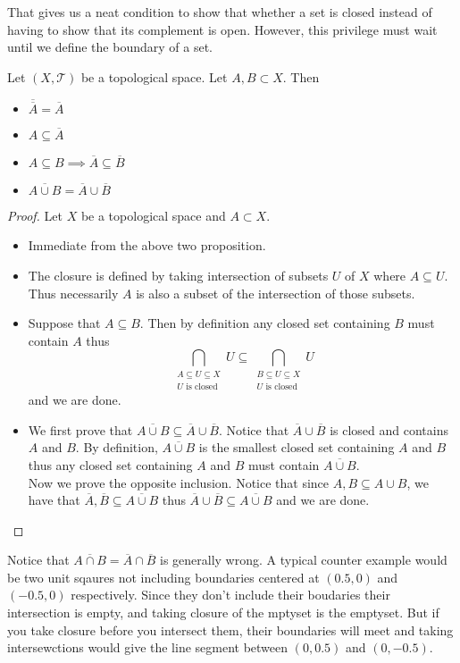 \documentclass[a4paper]{article}
\begin{document}
That gives us a neat condition to show that whether a set is closed instead of having to show that its complement is open. However, this privilege must wait until we define the boundary of a set. 

\begin{prp}{}{} Let $(X,\mathcal{T})$ be a topological space. Let $A,B\subset X$. Then 
\begin{itemize}
\item $\overline{\overline{A}}=\overline{A}$
\item $A\subseteq\overline{A}$
\item $A\subseteq B\implies\overline{A}\subseteq\overline{B}$
\item $\overline{A\cup B}=\overline{A}\cup\overline{B}$
\end{itemize}
\begin{proof} Let $X$ be a topological space and $A\subset X$. 
\begin{itemize}
\item Immediate from the above two proposition. 
\item The closure is defined by taking intersection of subsets $U$ of $X$ where $A\subseteq U$. Thus necessarily $A$ is also a subset of the intersection of those subsets. 
\item Suppose that $A\subseteq B$. Then by definition any closed set containing $B$ must contain $A$ thus $$\bigcap_{\substack{A\subseteq U\subseteq X\\U\text{ is closed}}}U\subseteq\bigcap_{\substack{B\subseteq U\subseteq X\\U\text{ is closed}}}U$$ and we are done. 
\item We first prove that $\overline{A\cup B}\subseteq\overline{A}\cup\overline{B}$. Notice that $\overline{A}\cup\overline{B}$ is closed and contains $A$ and $B$. By definition, $\overline{A\cup B}$ is the smallest closed set containing $A$ and $B$ thus any closed set containing $A$ and $B$ must contain $\overline{A\cup B}$. \\
Now we prove the opposite inclusion. Notice that since $A,B\subseteq A\cup B$, we have that $\overline{A},\overline{B}\subseteq\overline{A\cup B}$ thus $\overline{A}\cup\overline{B}\subseteq\overline{A\cup B}$ and we are done. 
\end{itemize}
\end{proof}
\end{prp}

Notice that $\overline{A \cap B}=\overline{A}\cap\overline{B}$ is generally wrong. A typical counter example would be two unit sqaures not including boundaries centered at $(0.5,0)$ and $(-0.5,0)$ respectively. Since they don't include their boudaries their intersection is empty, and taking closure of the mptyset is the emptyset. But if you take closure before you intersect them, their boundaries will meet and taking intersewctions would give the line segment between $(0,0.5)$ and $(0,-0.5)$. \\
\end{document}
